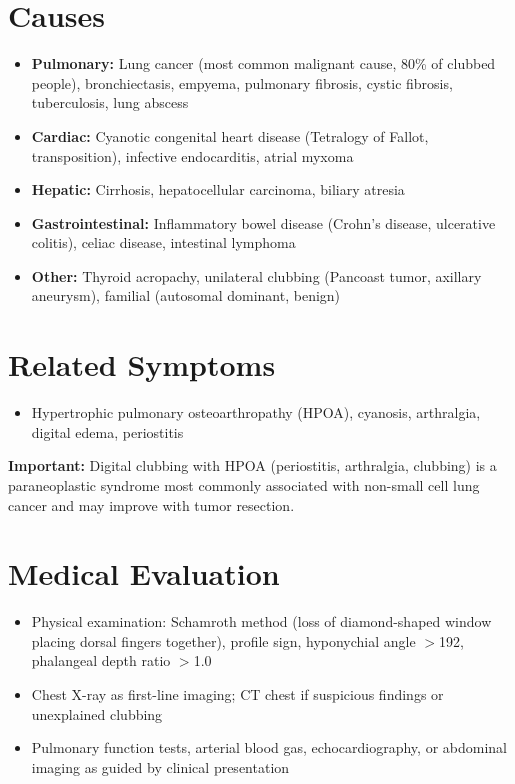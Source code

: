 \section*{Causes}
\begin{itemize}
  \item \textbf{Pulmonary:} Lung cancer (most common malignant cause, 80\% of clubbed people), bronchiectasis, empyema, pulmonary fibrosis, cystic fibrosis, tuberculosis, lung abscess
  \item \textbf{Cardiac:} Cyanotic congenital heart disease (Tetralogy of Fallot, transposition), infective endocarditis, atrial myxoma
  \item \textbf{Hepatic:} Cirrhosis, hepatocellular carcinoma, biliary atresia
  \item \textbf{Gastrointestinal:} Inflammatory bowel disease (Crohn's disease, ulcerative colitis), celiac disease, intestinal lymphoma
  \item \textbf{Other:} Thyroid acropachy, unilateral clubbing (Pancoast tumor, axillary aneurysm), familial (autosomal dominant, benign)
\end{itemize}

\section*{Related Symptoms}
\begin{itemize}
  \item Hypertrophic pulmonary osteoarthropathy (HPOA), cyanosis, arthralgia, digital edema, periostitis
\end{itemize}
\textbf{Important:} Digital clubbing with HPOA (periostitis, arthralgia, clubbing) is a paraneoplastic syndrome most commonly associated with non-small cell lung cancer and may improve with tumor resection.

\section*{Medical Evaluation}
\begin{itemize}
  \item Physical examination: Schamroth method (loss of diamond-shaped window placing dorsal fingers together), profile sign, hyponychial angle \ensuremath{>}192\textdegree{}, phalangeal depth ratio \ensuremath{>}1.0
  \item Chest X-ray as first-line imaging; CT chest if suspicious findings or unexplained clubbing
  \item Pulmonary function tests, arterial blood gas, echocardiography, or abdominal imaging as guided by clinical presentation
\end{itemize}

